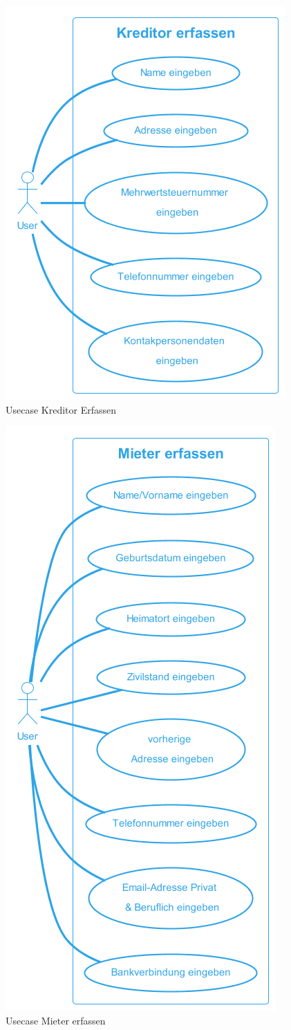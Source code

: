 \begin{figure}[H]
  \begin{center}
    \includegraphics[width=0.4\linewidth]{content/diagrams/out/usecase/kreditorErfassen/Kreditor erfassen.png}
    \caption{Usecase Kreditor Erfassen}
  \end{center}
  \label{kreditorErfassen}
\end{figure}

\begin{figure}[H]
  \begin{center}
    \includegraphics[width=0.4\linewidth]{content/diagrams/out/usecase/mieterErfassen/Mieter erfassen.png}
    \caption{Usecase Mieter erfassen}
  \end{center}
  \label{mieterErfassen}
\end{figure}